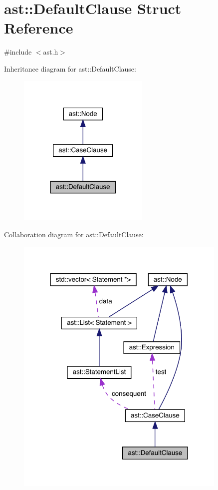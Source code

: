 \hypertarget{structast_1_1_default_clause}{}\section{ast\+:\+:Default\+Clause Struct Reference}
\label{structast_1_1_default_clause}


{\ttfamily \#include $<$ast.\+h$>$}



Inheritance diagram for ast\+:\+:Default\+Clause\+:\nopagebreak
\begin{figure}[H]
\begin{center}
\leavevmode
\includegraphics[width=178pt]{structast_1_1_default_clause__inherit__graph}
\end{center}
\end{figure}


Collaboration diagram for ast\+:\+:Default\+Clause\+:\nopagebreak
\begin{figure}[H]
\begin{center}
\leavevmode
\includegraphics[width=286pt]{structast_1_1_default_clause__coll__graph}
\end{center}
\end{figure}
